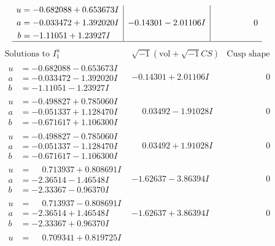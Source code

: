 \documentclass[1p]{elsarticle_modified}
\theoremstyle{definition}
\newcommand{\I}{\sqrt{-1}}
\begin{document}
$$\begin{array}{c|c|c}
\begin{aligned}
u &= -0.682088 + 0.653673 I \\
a &= -0.033472 + 1.392020 I \\
b &= -1.11051 + 1.23927 I\end{aligned}
 & -0.14301 - 2.01106 I & \phantom{-0.000000 } 0\\
 \hline 
 \end{array}$$\newpage$$\begin{array}{c|c|c}  
\text{Solutions to }I^u_{1}& \I (\text{vol} + \sqrt{-1}CS) & \text{Cusp shape}\\
 \hline 
\begin{aligned}
u &= -0.682088 - 0.653673 I \\
a &= -0.033472 - 1.392020 I \\
b &= -1.11051 - 1.23927 I\end{aligned}
 & -0.14301 + 2.01106 I & \phantom{-0.000000 } 0 \\ \hline\begin{aligned}
u &= -0.498827 + 0.785060 I \\
a &= -0.051337 + 1.128470 I \\
b &= -0.671617 + 1.106300 I\end{aligned}
 & \phantom{-}0.03492 - 1.91028 I & \phantom{-0.000000 } 0 \\ \hline\begin{aligned}
u &= -0.498827 - 0.785060 I \\
a &= -0.051337 - 1.128470 I \\
b &= -0.671617 - 1.106300 I\end{aligned}
 & \phantom{-}0.03492 + 1.91028 I & \phantom{-0.000000 } 0 \\ \hline\begin{aligned}
u &= \phantom{-}0.713937 + 0.808691 I \\
a &= -2.36514 - 1.46548 I \\
b &= -2.33367 - 0.96370 I\end{aligned}
 & -1.62637 - 3.86394 I & \phantom{-0.000000 } 0 \\ \hline\begin{aligned}
u &= \phantom{-}0.713937 - 0.808691 I \\
a &= -2.36514 + 1.46548 I \\
b &= -2.33367 + 0.96370 I\end{aligned}
 & -1.62637 + 3.86394 I & \phantom{-0.000000 } 0 \\ \hline\begin{aligned}
u &= \phantom{-}0.709341 + 0.819725 I \\

\end{aligned}
\end{array}$$
\end{document}
